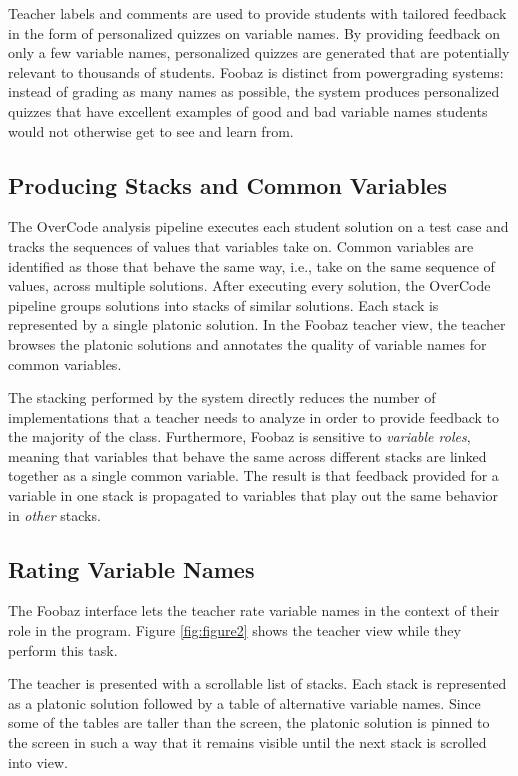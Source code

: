 Teacher labels and comments are used to provide students with tailored feedback in the form of personalized quizzes on variable names. By providing feedback on only a few variable names, personalized quizzes are generated that are potentially relevant to thousands of students. Foobaz is distinct from powergrading systems: instead of grading as many names as possible, the system produces personalized quizzes that have excellent examples of good and bad variable names students would not otherwise get to see and learn from.

\subsection{Producing Stacks and Common Variables}
The OverCode analysis pipeline executes each student solution on a test case and tracks the sequences of values that variables take on. Common variables are identified as those that behave the same way, i.e., take on the same sequence of values, across multiple solutions. After executing every solution, the OverCode pipeline groups solutions into stacks of similar solutions. Each stack is represented by a single platonic solution. In the Foobaz teacher view, the teacher browses the platonic solutions and annotates the quality of variable names for common variables. 

The stacking performed by the system directly reduces the number of implementations that a teacher needs to analyze in order to provide feedback to the majority of the class. Furthermore, Foobaz is sensitive to \emph{variable roles}, meaning that variables that behave the same across different stacks are linked together as a single common variable. The result is that feedback provided for a variable in one stack is propagated to variables that play out the same behavior in \emph{other} stacks.

\subsection{Rating Variable Names}

The Foobaz interface lets the teacher rate variable names in the context of their role in the program. Figure \ref{fig:figure2} shows the teacher view while they perform this task. 

The teacher is presented with a scrollable list of stacks. Each stack is represented as a platonic solution followed by a table of alternative variable names. Since some of the tables are taller than the screen, the platonic solution is pinned to the screen in such a way that it remains visible until the next stack is scrolled into view.

